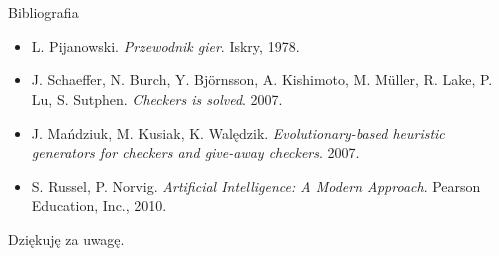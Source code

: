 \documentclass{beamer}
\newcommand{\myitem}{\item[$\vartriangleright$]}
\begin{document}
\section*{}
\appendix

	\begin{frame}{Bibliografia}
		\begin{center}
			\begin{itemize}
				\myitem L. Pijanowski. \textit{Przewodnik gier}. Iskry, 1978.
				\myitem J. Schaeffer, N. Burch, Y. Björnsson, A. Kishimoto, M. Müller, R. Lake, P. Lu, S. Sutphen. \textit{Checkers is solved}. 2007.
				\myitem J. Mańdziuk, M. Kusiak, K. Walędzik. \textit{Evolutionary-based heuristic generators for checkers and give-away checkers}. 2007.
				\myitem S. Russel, P. Norvig. \textit{Artificial Intelligence: A Modern Approach}. Pearson Education, Inc., 2010.
			\end{itemize}
		\end{center}
	\end{frame}

	\begin{frame}{}
		\begin{center}
			\large{Dziękuję za uwagę.}
		\end{center}
	\end{frame}

    

    
\end{document}

